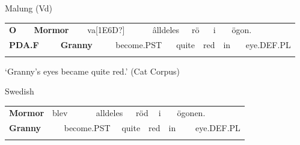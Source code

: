 \begin{styleExLtrTblii}
Malung (Vd)

\end{styleExLtrTblii}

\begin{tabular}{llllllllllllll}
\lsptoprule
{\bfseries O} & \multicolumn{2}{l}{{\bfseries Mormor}

} & \multicolumn{2}{l}{va[1E6D?]

} & \multicolumn{2}{l}{âlldeles

} & \multicolumn{2}{l}{rö

} & \multicolumn{2}{l}{i

} & \multicolumn{2}{l}{ögon.

} & \\
\multicolumn{2}{l}{{\bfseries PDA.F}

} & \multicolumn{2}{l}{{\bfseries Granny}

} & \multicolumn{2}{l}{become.PST

} & \multicolumn{2}{l}{quite

} & \multicolumn{2}{l}{red

} & \multicolumn{2}{l}{in

} & \multicolumn{2}{l}{eye.DEF.PL

}\\
\lspbottomrule
\end{tabular}

\begin{styleTranslation}
‘Granny’s eyes became quite red.’ (Cat Corpus)

\end{styleTranslation}

\begin{styleExLtrTblii}
Swedish

\end{styleExLtrTblii}

\begin{tabular}{llllllllllll}
\lsptoprule
{\bfseries Mormor} & \multicolumn{2}{l}{blev

} & \multicolumn{2}{l}{alldeles

} & \multicolumn{2}{l}{röd

} & \multicolumn{2}{l}{i

} & \multicolumn{2}{l}{ögonen.

} & \\
\multicolumn{2}{l}{{\bfseries Granny}

} & \multicolumn{2}{l}{become.PST

} & \multicolumn{2}{l}{quite

} & \multicolumn{2}{l}{red

} & \multicolumn{2}{l}{in

} & \multicolumn{2}{l}{eye.DEF.PL

}\\
\lspbottomrule
\end{tabular}


